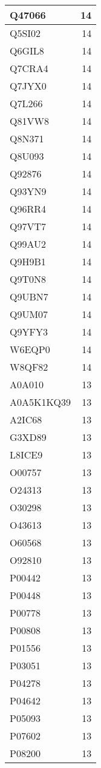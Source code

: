 \documentclass[
]{book}
\theoremstyle{definition}
\theoremstyle{definition}
\theoremstyle{definition}
\theoremstyle{definition}
\theoremstyle{remark}
\begin{document}
\begin{table}
\begin{tabular}{l|r}
\hline
Q47066 & 14\\
\hline
Q5SI02 & 14\\
\hline
Q6GIL8 & 14\\
\hline
Q7CRA4 & 14\\
\hline
Q7JYX0 & 14\\
\hline
Q7L266 & 14\\
\hline
Q81VW8 & 14\\
\hline
Q8N371 & 14\\
\hline
Q8U093 & 14\\
\hline
Q92876 & 14\\
\hline
Q93YN9 & 14\\
\hline
Q96RR4 & 14\\
\hline
Q97VT7 & 14\\
\hline
Q99AU2 & 14\\
\hline
Q9H9B1 & 14\\
\hline
Q9T0N8 & 14\\
\hline
Q9UBN7 & 14\\
\hline
Q9UM07 & 14\\
\hline
Q9YFY3 & 14\\
\hline
W6EQP0 & 14\\
\hline
W8QF82 & 14\\
\hline
A0A010 & 13\\
\hline
A0A5K1KQ39 & 13\\
\hline
A2IC68 & 13\\
\hline
G3XD89 & 13\\
\hline
L8ICE9 & 13\\
\hline
O00757 & 13\\
\hline
O24313 & 13\\
\hline
O30298 & 13\\
\hline
O43613 & 13\\
\hline
O60568 & 13\\
\hline
O92810 & 13\\
\hline
P00442 & 13\\
\hline
P00448 & 13\\
\hline
P00778 & 13\\
\hline
P00808 & 13\\
\hline
P01556 & 13\\
\hline
P03051 & 13\\
\hline
P04278 & 13\\
\hline
P04642 & 13\\
\hline
P05093 & 13\\
\hline
P07602 & 13\\
\hline
P08200 & 13\\

\end{tabular}
\end{table}
\end{document}
